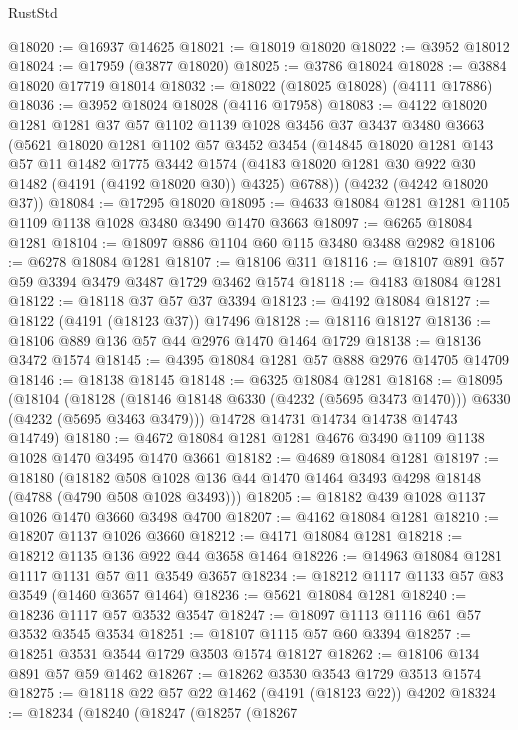 \begin{lexlean}{RustStd}
\begin{coremodule}
@18020 := @16937 @14625
@18021 := @18019 @18020
@18022 := @3952 @18012
@18024 := @17959 (@3877 @18020)
@18025 := @3786 @18024
@18028 := @3884 @18020 @17719 @18014
@18032 := @18022 (@18025 @18028) (@4111 @17886)
@18036 := @3952 @18024 @18028 (@4116 @17958)
@18083 := @4122
    @18020
    @1281
    @1281
    @37
    @57
    @1102
    @1139
    @1028
    @3456
    @37
    @3437
    @3480
    @3663
    (@5621
      @18020
      @1281
      @1102
      @57
      @3452
      @3454
      (@14845
        @18020
        @1281
        @143
        @57
        @11
        @1482
        @1775
        @3442
        @1574
        (@4183 @18020 @1281 @30 @922 @30 @1482 (@4191 (@4192 @18020 @30)) @4325)
        @6788))
    (@4232 (@4242 @18020 @37))
@18084 := @17295 @18020
@18095 := @4633 @18084 @1281 @1281 @1105 @1109 @1138 @1028 @3480 @3490 @1470 @3663
@18097 := @6265 @18084 @1281
@18104 := @18097 @886 @1104 @60 @115 @3480 @3488 @2982
@18106 := @6278 @18084 @1281
@18107 := @18106 @311
@18116 := @18107 @891 @57 @59 @3394 @3479 @3487 @1729 @3462 @1574
@18118 := @4183 @18084 @1281
@18122 := @18118 @37 @57 @37 @3394
@18123 := @4192 @18084
@18127 := @18122 (@4191 (@18123 @37)) @17496
@18128 := @18116 @18127
@18136 := @18106 @889 @136 @57 @44 @2976 @1470 @1464 @1729
@18138 := @18136 @3472 @1574
@18145 := @4395 @18084 @1281 @57 @888 @2976 @14705 @14709
@18146 := @18138 @18145
@18148 := @6325 @18084 @1281
@18168 := @18095
    (@18104
      (@18128 (@18146 @18148 @6330 (@4232 (@5695 @3473 @1470))) @6330 (@4232 (@5695 @3463 @3479)))
      @14728
      @14731
      @14734
      @14738
      @14743
      @14749)
@18180 := @4672 @18084 @1281 @1281 @4676 @3490 @1109 @1138 @1028 @1470 @3495 @1470 @3661
@18182 := @4689 @18084 @1281
@18197 := @18180
    (@18182 @508 @1028 @136 @44 @1470 @1464 @3493 @4298 @18148 (@4788 (@4790 @508 @1028 @3493)))
@18205 := @18182 @439 @1028 @1137 @1026 @1470 @3660 @3498 @4700
@18207 := @4162 @18084 @1281
@18210 := @18207 @1137 @1026 @3660
@18212 := @4171 @18084 @1281
@18218 := @18212 @1135 @136 @922 @44 @3658 @1464
@18226 := @14963 @18084 @1281 @1117 @1131 @57 @11 @3549 @3657
@18234 := @18212 @1117 @1133 @57 @83 @3549 (@1460 @3657 @1464)
@18236 := @5621 @18084 @1281
@18240 := @18236 @1117 @57 @3532 @3547
@18247 := @18097 @1113 @1116 @61 @57 @3532 @3545 @3534
@18251 := @18107 @1115 @57 @60 @3394
@18257 := @18251 @3531 @3544 @1729 @3503 @1574 @18127
@18262 := @18106 @134 @891 @57 @59 @1462
@18267 := @18262 @3530 @3543 @1729 @3513 @1574
@18275 := @18118 @22 @57 @22 @1462 (@4191 (@18123 @22)) @4202
@18324 := @18234
    (@18240
      (@18247
        (@18257
          (@18267

\end{coremodule}
\end{lexlean}

